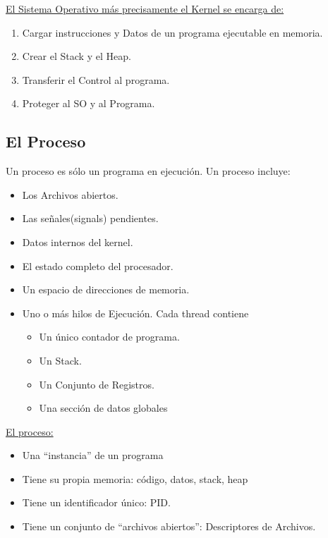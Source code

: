 \documentclass[../main.tex]{subfiles}
\begin{document}
        \underline{El Sistema Operativo más precisamente el Kernel se encarga de:}
        \begin{enumerate}
            \item Cargar instrucciones y Datos de un programa ejecutable en memoria.
            \item Crear el Stack y el Heap.
            \item Transferir el Control al programa.
            \item Proteger al SO y al Programa.
        \end{enumerate}

    \subsection*{El Proceso}
        Un proceso es sólo un programa en ejecución. Un proceso incluye:
        \begin{itemize}
            \item Los Archivos abiertos.
            \item Las señales(signals) pendientes.
            \item Datos internos del kernel.
            \item El estado completo del procesador.
            \item Un espacio de direcciones de memoria.
            \item Uno o más hilos de Ejecución. Cada thread contiene
                \begin{itemize}
                    \item Un único contador de programa.
                    \item Un Stack.
                    \item Un Conjunto de Registros.
                    \item Una sección de datos globales
                \end{itemize}    
        \end{itemize}
        
      
        \underline{El proceso:}
        \begin{itemize}
            \item Una “instancia” de un programa
            \item Tiene su propia memoria: código, datos, stack, heap
            \item Tiene un identificador único: PID.
            \item Tiene un conjunto de “archivos abiertos”: Descriptores de Archivos.
        \end{itemize}
        
\end{document}
